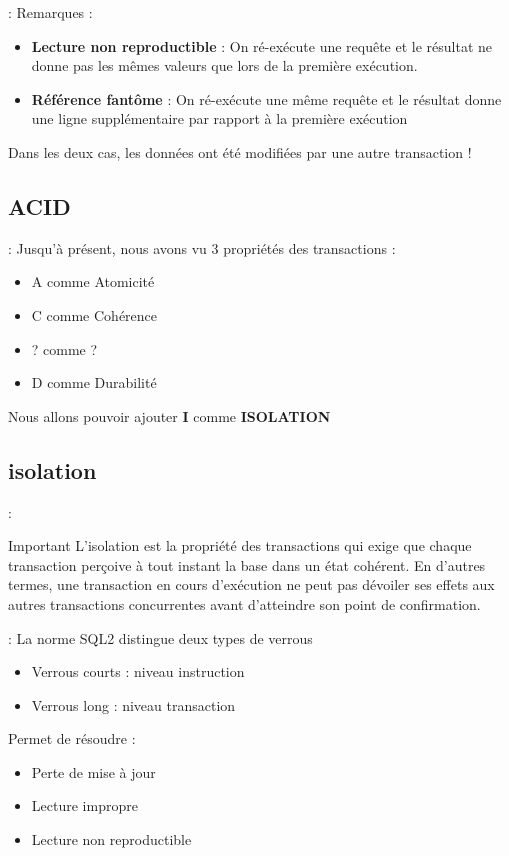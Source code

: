 \documentclass[10pt]{beamer}
\begin{document}
\begin{frame}{\secname : \subsecname}
    Remarques :
    \begin{itemize}
        \item \textbf{Lecture non reproductible} : On ré-exécute une requête et le résultat ne donne pas les mêmes valeurs que lors de la première exécution.
        \item \textbf{Référence fantôme} : On ré-exécute une même requête et le résultat donne une ligne supplémentaire par rapport à la première exécution
    \end{itemize}
    Dans les deux cas, les données ont été modifiées par une autre transaction !
\end{frame}

\subsection{ACID}
\begin{frame}{\secname : \subsecname}
    Jusqu'à présent, nous avons vu 3 propriétés des transactions :
    \begin{itemize}
        \item A	comme Atomicité
        \item C	comme Cohérence
        \item ?	comme ?
        \item D	comme Durabilité
    \end{itemize}
    Nous allons pouvoir ajouter \textbf{I} comme \textbf{ISOLATION}
\end{frame}

\subsection{isolation}
\begin{frame}{\secname : \subsecname}
    \begin{alertblock}{Important}
        L'isolation est la propriété des transactions qui exige que chaque transaction perçoive à tout instant la base dans un état cohérent.
        En d'autres termes, une transaction en cours d'exécution ne peut pas dévoiler ses effets aux autres transactions concurrentes avant d'atteindre son point de confirmation.
    \end{alertblock}
\end{frame}

\begin{frame}{\secname : \subsecname}
    La norme SQL2 distingue deux types de verrous
    \begin{itemize}
        \item Verrous courts : niveau instruction
        \item Verrous long : niveau transaction
    \end{itemize}
    Permet de résoudre :
    \begin{itemize}
        \item Perte de mise à jour
        \item Lecture impropre
        \item Lecture non reproductible
    \end{itemize}
\end{frame}
\end{document}
